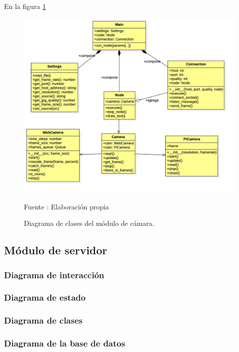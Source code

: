 En la figura \ref{fig:camera_clases}
\begin{figure}[H]
    \begin{center}
        \includegraphics[width=15cm]{img/capitulo_4/camera_clases.jpg}
        \caption{Diagrama de clases del módulo de cámara.}
        Fuente : Elaboración propia
        \label{fig:camera_clases}
    \end{center}
\end{figure}

\subsection{Módulo de servidor}

\subsubsection{Diagrama de interacción}

\subsubsection{Diagrama de estado}

\subsubsection{Diagrama de clases}

\subsubsection{Diagrama de la base de datos}

